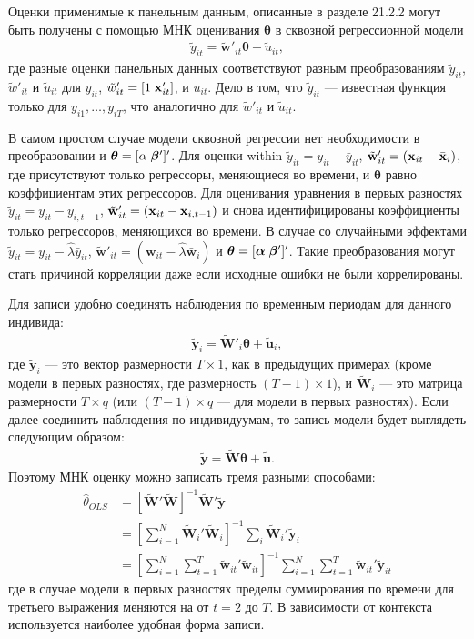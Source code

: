 Оценки применимые к панельным данным, описанные в разделе 21.2.2 могут быть получены с помощью МНК оценивания $\bm\theta$ в сквозной регрессионной модели
\begin{align}
\tilde{y}_{it}=\tilde{\mathbf w}'_{it} \bm\theta+\tilde{u}_{it},
\label{Eq:21.12}
\end{align}
где разные оценки панельных данных соответствуют разным преобразованиям $\tilde{y}_{it}$,
 $\tilde{w}'_{it}$ и $\tilde{u}_{it}$ для $y_{it}$, $\tilde{w}'_{it}=[1\; \mathbf{x}'_{it}]$, и $u_{it}$. Дело в том, что $\tilde{y}_{it}$ --- известная функция только для $y_{i1}, \dots, y_{iT}$, что аналогично для  $\tilde{w}'_{it}$ и $\tilde{u}_{it}$.

В самом простом случае модели сквозной регрессии нет необходимости в преобразовании и $\bm\theta=[\alpha \; \bm{\beta}']'$. Для оценки within $\tilde{y}_{it}=y_{it}-\bar{y}_{it}$, $\tilde{\mathbf w}'_{it}=(\mathbf{x}_{it}-\bar{\mathbf{x}}_i)$, где присутствуют только регрессоры, меняющиеся во времени, и $\bm\theta$ равно коэффициентам этих регрессоров. Для оценивания уравнения в первых разностях $\tilde{y}_{it}=y_{it}-{y}_{i,t-1}$, $\tilde{\mathbf w}'_{it}=(\mathbf{x}_{it}-\mathbf{x}_{i,t-1})$ и снова идентифицированы коэффициенты только регрессоров, меняющихся во времени. В случае со случайными эффектами $\tilde{y}_{it}=y_{it}-\hat{\lambda}\bar{y}_{it}$, $\tilde{\mathbf w}'_{it}=(\mathbf w_{it}-\hat{\lambda} \bar{\mathbf w}_i)$ и $\bm\theta=[\bm\alpha \; \bm{\beta}']'$. Такие преобразования могут стать причиной корреляции даже если исходные ошибки не были коррелированы.

Для записи удобно соединять наблюдения по временным периодам для данного индивида:
\begin{align}
\widetilde{\mathbf y}_{i}=\widetilde{\mathbf W}'_{i} \bm\theta+\tilde{\mathbf u}_{i},
\nonumber
\end{align}
где $\tilde{\mathbf{y}}_{i}$ --- это вектор размерности $T \times 1$, как в предыдущих примерах (кроме модели в первых разностях, где размерность $(T-1) \times 1$), и $\tilde{\mathbf{W}}_i$  --- это матрица размерности $T \times q$ (или $(T-1) \times q$ --- для модели в первых разностях). Если далее соединить наблюдения по индивидуумам, то запись модели будет выглядеть следующим образом:
 \begin{align}
\tilde{\mathbf y}=\widetilde{\mathbf W} \bm\theta+\tilde{\mathbf u}.
\nonumber
\end{align}
Поэтому МНК оценку можно записать тремя разными способами:
 \begin{align}
\hat{\theta}_{OLS}
&=[\tilde{\mathbf W}'\tilde{\mathbf W}]^{-1}\tilde{\mathbf W}'\tilde{\mathbf y} \nonumber \\
& = \left[\sum^{N}_{i=1} \tilde{\mathbf W}_i'\tilde{\mathbf W}_i\right]^{-1}\sum_i \tilde{\mathbf W}_i'\tilde{\mathbf y}_i \nonumber \\
& =\left[\sum^{N}_{i=1} \sum^{T}_{t=1}\tilde{\mathbf w}_{it}'\tilde{\mathbf w}_{it}\right]^{-1}\sum_{i=1}^{N} \sum_{t=1}^{T} \tilde{\mathbf w}_{it}'\tilde{\mathbf y}_{it}
\nonumber
\end{align}
где в случае модели в первых разностях пределы суммирования по времени для третьего выражения меняются на от $t=2$ до $T$. В зависимости от контекста используется наиболее удобная форма записи.

